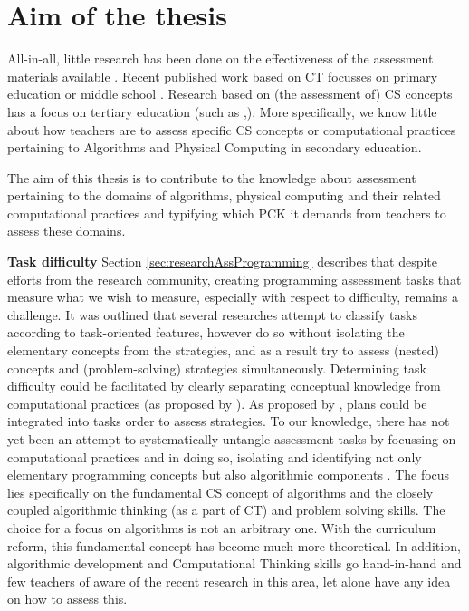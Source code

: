 \section{Aim of the thesis}\label{sec:aim}
All-in-all, little research has been done on the effectiveness of the assessment materials available \cite{Yadav2016}. Recent published work based on CT focusses on primary education or middle school \cite{LyeKoh2014}. Research based on (the assessment of) CS concepts has a focus on tertiary education (such as \cite{McCracken2001},\cite{2010TewGuzdial}). More specifically, we know little about how teachers are to assess specific CS concepts or computational practices pertaining to Algorithms and Physical Computing in secondary education.

The aim of this thesis is to contribute to the knowledge about assessment pertaining to the domains of algorithms, physical computing and their related computational practices and typifying which PCK it demands from teachers to assess these domains.

\noindent \textbf{Task difficulty}\newline
Section \ref{sec:researchAssProgramming} describes that despite efforts from the research community, creating programming assessment tasks that measure what we wish to measure, especially with respect to difficulty, remains a challenge. It was outlined that several researches attempt to classify tasks according to task-oriented features, however do so without isolating the elementary concepts from the strategies, and as a result try to assess (nested) concepts and (problem-solving) strategies simultaneously. Determining task difficulty could be facilitated by clearly separating conceptual knowledge from computational practices (as proposed by \citeauthor{BrennanResnick2012}). As proposed by \citeauthor{deRaadt2009teachingPlans}, plans could be integrated into tasks order to assess strategies. To our knowledge, there has not yet been an attempt to systematically untangle assessment tasks by focussing on computational practices and in doing so, isolating and identifying not only elementary programming concepts but also algorithmic components \cite{deRaadt2008}. The focus lies specifically on the fundamental CS concept of algorithms and the closely coupled algorithmic thinking (as a part of CT) and problem solving skills. The choice for a focus on algorithms is not an arbitrary one. With the curriculum reform, this fundamental concept has become much more theoretical. In addition, algorithmic development and Computational Thinking skills go hand-in-hand and few teachers of aware of the recent research in this area, let alone have any idea on how to assess this.

